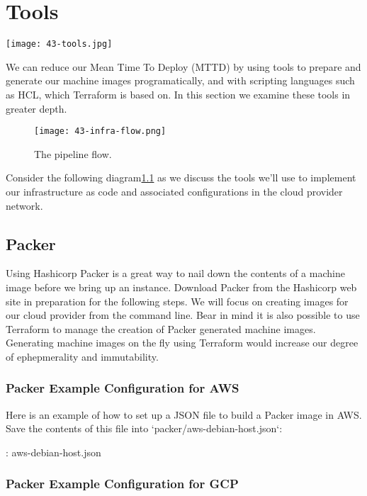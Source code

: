 \chapter{Tools}

\texttt{[image: 43-tools.jpg]}

We can reduce our Mean Time To Deploy (MTTD)
by using tools to prepare and generate our machine images
programatically, and with scripting languages such as HCL, which
Terraform
is based on. In this section we examine these tools in greater depth.

\begin{figure}
   \centering
   \texttt{[image: 43-infra-flow.png]}
   \caption{The pipeline flow.}
  \label{infraflow}
\end{figure}

Consider the following diagram\ref{infraflow} as we discuss the tools we'll
use to implement our infrastructure as code and associated
configurations in the cloud provider network.

\section{Packer}

\justifying
Using Hashicorp Packer is a great way to nail down the contents of a
machine image before we bring up an instance. Download Packer from the
Hashicorp web site in preparation for the following steps.
We will focus on creating images for our cloud provider from the
command line. Bear in mind it is also possible to use Terraform to
manage the creation of Packer generated machine images. Generating
machine images on the fly using Terraform would increase our degree of
ephepmerality and immutability.

\subsection{Packer Example Configuration for AWS}
\justifying
Here is an example of how to set up a JSON file to build a Packer image
in AWS. Save the contents of this file into
`packer/aws-debian-host.json`:

\justifying
\begin{mybox}{\thetcbcounter: aws-debian-host.json}
	
\end{mybox}

\subsection{Packer Example Configuration for GCP}

